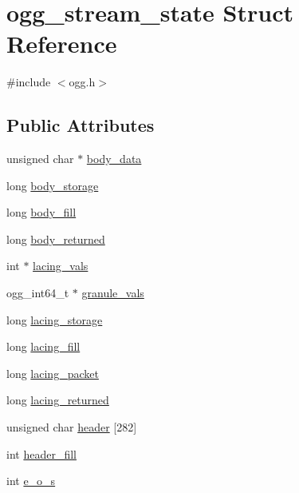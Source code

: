 \hypertarget{structogg__stream__state}{}\section{ogg\+\_\+stream\+\_\+state Struct Reference}
\label{structogg__stream__state}


{\ttfamily \#include $<$ogg.\+h$>$}

\subsection*{Public Attributes}
\begin{DoxyCompactItemize}
\item 
unsigned char $\ast$ \hyperlink{structogg__stream__state_a70d03b6f99c1d1e57f55e800b087dae8}{body\+\_\+data}
\item 
long \hyperlink{structogg__stream__state_acc4cf19d7e31e1a6daab8f76fdb0afd6}{body\+\_\+storage}
\item 
long \hyperlink{structogg__stream__state_a19d45a7b5004f13ae02b5a9502354b93}{body\+\_\+fill}
\item 
long \hyperlink{structogg__stream__state_a602e02c9b0d5653eea5bd4f97bade116}{body\+\_\+returned}
\item 
int $\ast$ \hyperlink{structogg__stream__state_a55f3febfdfa9600b66fa2a990297813e}{lacing\+\_\+vals}
\item 
ogg\+\_\+int64\+\_\+t $\ast$ \hyperlink{structogg__stream__state_a5ddadad0bd4d5c5381b21da6f11a7d0c}{granule\+\_\+vals}
\item 
long \hyperlink{structogg__stream__state_a23844488216514760bc66b38dfd6d4ae}{lacing\+\_\+storage}
\item 
long \hyperlink{structogg__stream__state_a6090ad58db768aa90218b0bc421d6f0e}{lacing\+\_\+fill}
\item 
long \hyperlink{structogg__stream__state_add3aba822d7f0e2e23c1927a20aaa683}{lacing\+\_\+packet}
\item 
long \hyperlink{structogg__stream__state_a541d66311781b45cf37d87107d515602}{lacing\+\_\+returned}
\item 
unsigned char \hyperlink{structogg__stream__state_aeb8496ef8051c2760c5d57424f30171a}{header} \mbox{[}282\mbox{]}
\item 
int \hyperlink{structogg__stream__state_af37e7ffba5e7197c8bfabee7a1a6b641}{header\+\_\+fill}
\item 
int \hyperlink{structogg__stream__state_a366e94e72849e0e880d53a22bb9ee646}{e\+\_\+o\+\_\+s}

\end{DoxyCompactItemize}
